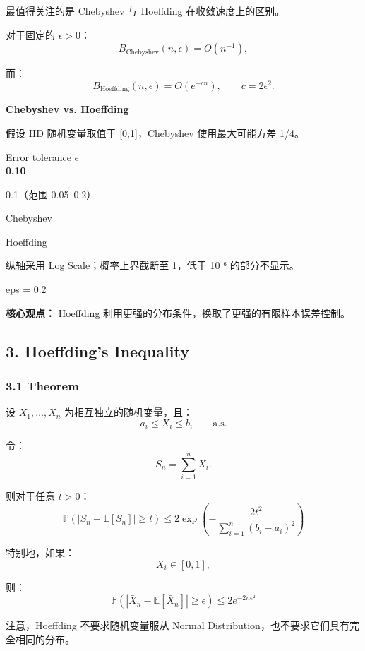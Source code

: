最值得关注的是 Chebyshev 与 Hoeffding 在收敛速度上的区别。

对于固定的 \(\epsilon>0\)：
\[B_{\mathrm{Chebyshev}}(n,\epsilon)
=
O(n^{-1}),\]

而：
\[B_{\mathrm{Hoeffding}}(n,\epsilon)
=
O(e^{-cn}),
\qquad c=2\epsilon^2.\]

\textbf{Chebyshev vs. Hoeffding}

假设 IID 随机变量取值于 {[}0,1{]}，Chebyshev 使用最大可能方差 1/4。

Error tolerance \(\epsilon\)\\
\textbf{0.10}

0.1（范围 0.05--0.2）


Chebyshev

Hoeffding

纵轴采用 Log Scale；概率上界截断至 1，低于 10⁻⁶ 的部分不显示。

eps = 0.2


\textbf{核心观点：} Hoeffding 利用更强的分布条件，换取了更强的有限样本误差控制。

\hypertarget{part-2-14-0001-hoeffdings-inequality}{%
\subsection{3. Hoeffding's Inequality}\label{part-2-14-0001-hoeffdings-inequality}}

\hypertarget{part-2-14-0001-theorem}{%
\subsubsection{3.1 Theorem}\label{part-2-14-0001-theorem}}

设 \(X_1,\ldots,X_n\) 为相互独立的随机变量，且：
\[a_i\leq X_i\leq b_i
\qquad\text{a.s.}\]

令：
\[S_n=\sum_{i=1}^{n}X_i.\]

则对于任意 \(t>0\)：
\[\boxed{
\mathbb P
\left(
|S_n-\mathbb E[S_n]|\geq t
\right)
\leq
2\exp
\left(
-\frac{2t^2}
{\sum_{i=1}^{n}(b_i-a_i)^2}
\right)
}\]

特别地，如果：
\[X_i\in[0,1],\]

则：
\[\boxed{
\mathbb P
\left(
|\bar X_n-\mathbb E[\bar X_n]|
\geq\epsilon
\right)
\leq
2e^{-2n\epsilon^2}
}\]

注意，Hoeffding 不要求随机变量服从 Normal Distribution，也不要求它们具有完全相同的分布。

